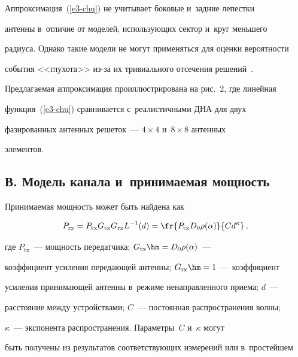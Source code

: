   


  Аппроксимация~(\ref{e3-chu}) не учитывает боковые и~задние лепестки 


антенны в~отличие от моделей, использующих сектор и~круг меньшего 


радиуса. Однако такие модели не могут применяться для оценки вероятности 


события <<глухота>> из-за их тривиального отсечения решений~\cite{5-chu}. 


Предлагаемая аппроксимация проиллюстрирована на рис.~2, где линейная 


функция~(\ref{e3-chu}) сравнивается с~реалистичными ДНА для двух 


фазированных антенных решеток~--- $4\times4$ и~$8\times8$ антенных 


элементов.


  





  \subsection*{В. Модель канала и~принимаемая мощность}


  


  Принимаемая мощность может быть найдена как


  \begin{equation}


  P_{\mathrm{rx}}= P_{\mathrm{tx}} G_{\mathrm{tx}} 


  G_{\mathrm{rx}} L^{-1}(d)=\fr{P_{\mathrm{tx}} D_0 


\rho(\alpha)}{Cd^\kappa}\,,


  \label{e4-chu}


  \end{equation}


где $P_{\mathrm{tx}}$~--- мощность передатчика; $G_{\mathrm{tx}}\hm= D_0\rho(\alpha)$~--- 


коэффициент усиления передающей антенны; $G_{\mathrm{rx}}\hm=1$~--- коэффициент 


усиления принимающей антенны в~режиме ненаправленного приема; $d$~--- 


расстояние между устройствами;  $C$~--- постоянная распространения волны; 


$\kappa$~--- экспонента распространения. Параметры~$C$ и~$\kappa$ могут 


быть получены из результатов соответствующих измерений или в~простейшем 


